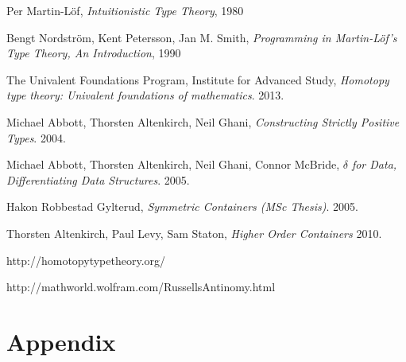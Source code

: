 \documentclass[12pt]{report}
\begin{document}
\begin{thebibliography}{10}

  Per Martin-L\"of,
  \emph{Intuitionistic Type Theory},
  1980

  Bengt Nordstr\"om, Kent Petersson, Jan M. Smith,
  \emph{Programming in Martin-L\"of's Type Theory, An Introduction},
  1990

  The Univalent Foundations Program, Institute for Advanced Study,
  \emph{Homotopy type theory: Univalent foundations of mathematics}.
  2013.

  Michael Abbott, Thorsten Altenkirch, Neil Ghani,
  \emph{Constructing Strictly Positive Types}.
  2004.
  
  Michael Abbott, Thorsten Altenkirch, Neil Ghani, Connor McBride,
  \emph{$\delta$ for Data, Differentiating Data Structures}.
  2005.

  Hakon Robbestad Gylterud,
  \emph{Symmetric Containers (MSc Thesis)}.
  2005.
  
  Thorsten Altenkirch, Paul Levy, Sam Staton,
  \emph{Higher Order Containers}
  2010.
  
  http://homotopytypetheory.org/
  
  http://mathworld.wolfram.com/RussellsAntinomy.html

\end{thebibliography}
\cleardoublepage
{}
{}

\chapter{Appendix}
\end{document}
